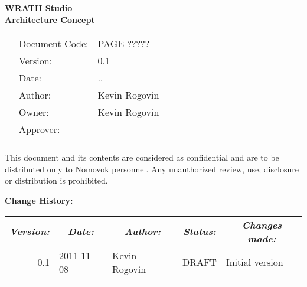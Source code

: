 \documentclass[a4paper,11pt]{article}
\renewcommand{\dateseparator}{.}
\newcommand{\todayiso}{\twodigit\day\dateseparator\twodigit\month\dateseparator\the\year}
\begin{document}
\begin{center}

\vspace*{105.5pt}
{\LARGE \bf WRATH Studio}\\
{\LARGE \bf Architecture Concept}\\
\vspace{71pt}

{
\begin{tabular}{lll}
  &Document Code: & PAGE-????? \\ 
  &Version: & 0.1 \\ 
  &Date: & \todayiso \\ 
  &Author: & Kevin Rogovin \\ 
  &Owner: & Kevin Rogovin \\ 
  &Approver: & - \\
  \multicolumn{1}{p{3.83cm}}{} &
  \multicolumn{1}{p{4.17cm}}{} & 
  \multicolumn{1}{p{8.00cm}}{}\\
\end{tabular}
}

\small
This document and its contents are considered as confidential and are to be distributed only to Nomovok personnel. 
Any unauthorized review, use, disclosure or distribution is prohibited. 

\end{center}

\newpage
\noindent\textbf{Change History:}
\label{sec:changelog}
\begin{table}[h!tbp]
  \begin{tabular}{rllll}
    \multicolumn{1}{c}{\textbf{\textit{Version:}}}& 
    \multicolumn{1}{c}{\textbf{\textit{Date:}}} & 
    \multicolumn{1}{c}{\textbf{\textit{Author:}}} &
    \multicolumn{1}{c}{\textbf{\textit{Status:}}} &
    \multicolumn{1}{c}{\textbf{\textit{Changes made:}}}\\
    0.1 & 2011-11-08 & Kevin Rogovin & DRAFT & Initial version \\
    \multicolumn{1}{p{1.8cm}}{}&
    \multicolumn{1}{p{2.18cm}}{}&
    \multicolumn{1}{p{3.42cm}}{}&
    \multicolumn{1}{p{2.31cm}}{}&
    \multicolumn{1}{p{6.2cm}}{}\\
  \end{tabular}
\end{table}
\end{document}
